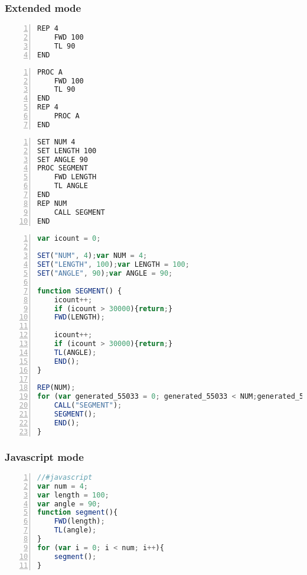 \documentclass[12pt]{exam}
\begin{document}
	\subsubsection{Extended mode}
		\begin{minipage}{\linewidth}
			\begin{lstlisting}[frame=single,numbers=left,caption=Extended mode using loops.,language=MyBasic]
REP 4
	FWD 100
	TL 90
END
			\end{lstlisting}
		\end{minipage}
		\begin{minipage}{\linewidth}
			\begin{lstlisting}[frame=single,numbers=left,caption=Extended mode using procedures and loops.,language=MyBasic]
PROC A
	FWD 100
	TL 90
END
REP 4
	PROC A
END
			\end{lstlisting}
		\end{minipage}
		\begin{minipage}{\linewidth}
			\begin{lstlisting}[frame=single,numbers=left,caption=Extended mode using procedures loops and variables.,language=MyBasic]
SET NUM 4
SET LENGTH 100
SET ANGLE 90
PROC SEGMENT
    FWD LENGTH
    TL ANGLE
END 
REP NUM
    CALL SEGMENT
END 
			\end{lstlisting}
		\end{minipage}
		\begin{minipage}{\linewidth}
			\begin{lstlisting}[frame=single,numbers=left,caption=The internal representation of the previous program.,language=Javascript]
var icount = 0; 

SET("NUM", 4);var NUM = 4; 
SET("LENGTH", 100);var LENGTH = 100; 
SET("ANGLE", 90);var ANGLE = 90; 

function SEGMENT() { 
	icount++; 
	if (icount > 30000){return;} 
	FWD(LENGTH); 

	icount++; 
	if (icount > 30000){return;} 
	TL(ANGLE); 
	END();
} 

REP(NUM);
for (var generated_55033 = 0; generated_55033 < NUM;generated_55033++) { 
	CALL("SEGMENT");
	SEGMENT(); 
	END();
}
			\end{lstlisting}
		\end{minipage}
	\subsubsection{Javascript mode}
		\begin{minipage}{\linewidth}
			\begin{lstlisting}[frame=single,numbers=left,caption=Javascript mode,language=JavaScript]
//#javascript
var num = 4;
var length = 100;
var angle = 90;
function segment(){
	FWD(length);
	TL(angle);
}
for (var i = 0; i < num; i++){
	segment();
}	
			\end{lstlisting}
		\end{minipage}
\end{document}
